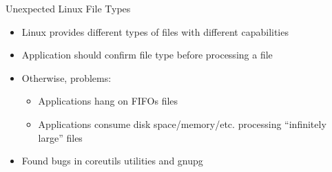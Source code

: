 \documentclass[pdf]{beamer}
\begin{document}
\begin{frame}{Unexpected Linux File Types}
  \begin{itemize}
  \item{Linux provides different types of files with different capabilities}
  \item{Application should confirm file type before processing a file}
  \item{Otherwise, problems:}
    \begin{itemize}
    \item{Applications hang on FIFOs files}
    \item{Applications consume disk space/memory/etc. processing ``infinitely
        large'' files}
    \end{itemize}
  \item{Found bugs in coreutils utilities and gnupg}
  \end{itemize}
\end{frame}
\end{document}
